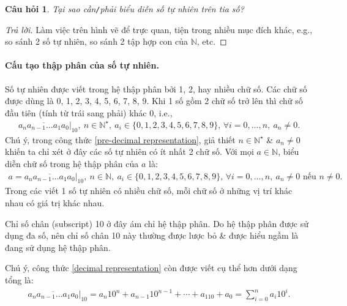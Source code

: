 \documentclass{article}
\numberwithin{equation}{section}
\newtheorem{question}{Câu hỏi}[section]
\begin{document}
\begin{question}
	Tại sao cần\emph{\texttt{/}}phải biểu diễn số tự nhiên trên tia số?
\end{question}

\begin{proof}[Trả lời]
	Làm việc trên hình vẽ để trực quan, tiện trong nhiều mục đích khác, e.g., so sánh 2 số tự nhiên, so sánh 2 tập hợp con của $\mathbb{N}$, etc.
\end{proof}

\paragraph{Cấu tạo thập phân của số tự nhiên.} Số tự nhiên được viết trong hệ thập phân bởi 1, 2, hay nhiều chữ số. Các chữ số được dùng là 0, 1, 2, 3, 4, 5, 6, 7, 8, 9. Khi 1 số gồm 2 chữ số trở lên thì chữ số đầu tiên (tính từ trái sang phải) khác 0, i.e.,
\begin{align}
	\label{pre-decimal representation}
	\overline{a_na_{n-1}\ldots a_1a_0}|_{10},\ n\in\mathbb{N}^\star,\ a_i\in\{0,1,2,3,4,5,6,7,8,9\},\,\forall i = 0,\ldots,n,\ a_n\ne 0.
\end{align}
Chú ý, trong công thức \eqref{pre-decimal representation}, giả thiết $n\in\mathbb{N}^\star$ \& $a_n\ne 0$ khiến ta chỉ xét ở đây các số tự nhiên có ít nhất 2 chữ số. Với mọi $a\in\mathbb{N}$, biểu diễn chữ số trong hệ thập phân của $a$ là:
\begin{align}
	\label{decimal representation}
	a = \overline{a_na_{n-1}\ldots a_1a_0}|_{10},\ n\in\mathbb{N},\ a_i\in\{0,1,2,3,4,5,6,7,8,9\},\,\forall i = 0,\ldots,n,\ a_n\ne 0\mbox{ nếu } n\ne 0.
\end{align}
Trong các viết 1 số tự nhiên có nhiều chữ số, mỗi chữ số ở những vị trí khác nhau có giá trị khác nhau.

Chỉ số chân (subscript) 10 ở đây ám chỉ hệ thập phân. Do hệ thập phân được sử dụng đa số, nên chỉ số chân 10 này thường được lược bỏ \& được hiểu ngầm là đang sử dụng hệ thập phân.

Chú ý, công thức \eqref{decimal representation} còn được viết cụ thể hơn dưới dạng tổng là:
\begin{align}
	\label{decimal representation expansion}
	\overline{a_na_{n-1}\ldots a_1a_0}|_{10} = a_n10^n + a_{n-1}10^{n-1} + \cdots + a_110 + a_0 = \sum_{i=0}^n a_i10^i.
\end{align}
\end{document}
